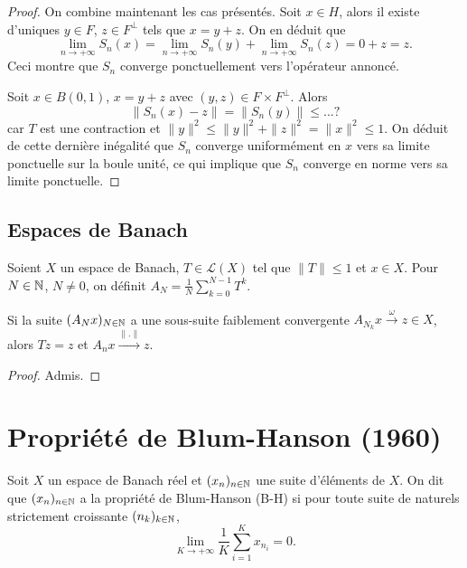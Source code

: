 \begin{proof}
  On combine maintenant les cas présentés. Soit $x\in H$, alors il existe
  d'uniques $y\in F$, $z\in F^{\perp}$ tels que $x = y + z$. On en déduit que
  $$\lim_{n\to+\infty}S_n(x) =
  \lim_{n\to+\infty}S_n(y) + \lim_{n\to+\infty}S_n(z)=
  0 + z = z.$$
  Ceci montre que $S_n$ converge ponctuellement vers l'opérateur annoncé.


  Soit $x\in B(0, 1)$, $x = y + z$ avec $(y, z)\in F\times F^\perp$.
  Alors $$\|S_n(x) - z \| = \|S_n(y)\| \leq ...?$$ %
  car $T$ est une contraction et
  $\|y\|^2\leq \|y\|^2 + \|z\|^2 = \|x\|^2 \leq 1$. On déduit de cette
  dernière inégalité que $S_n$ converge uniformément en $x$ vers sa limite
  ponctuelle sur la boule
  unité, ce qui implique que $S_n$ converge en norme vers sa limite ponctuelle.
\end{proof}

\subsection{Espaces de Banach}
\begin{thm}
  Soient $X$ un espace de Banach, $T\in\mathcal L(X)$ tel que $\|T\|\leq 1$
  et $x\in X$. Pour $N\in\mathbb{N}$, $N\neq 0$, on définit
  $A_N = \frac{1}{N}\sum_{k=0}^{N-1}T^k$.

  Si la suite $(A_Nx)_{N\in\mathbb{N}}$ a une sous-suite faiblement convergente
  $A_{N_k}x\xrightarrow{\omega}z\in X$, alors $Tz = z$ et
  $A_nx \xrightarrow{\|.\|} z$.
\end{thm}
\begin{proof}
  Admis.
\end{proof}
\section{Propriété de Blum-Hanson (1960)}
\begin{df}
  Soit $X$ un espace de Banach réel et $(x_n)_{n\in\mathbb{N}}$ une suite d'éléments de
  $X$. On dit que $(x_n)_{n\in\mathbb{N}}$ a la propriété de Blum-Hanson (B-H) si
  pour toute suite de naturels strictement croissante $(n_k)_{k\in\mathbb{N}}$,
  $$\lim_{K\to+\infty}\frac{1}{K}\sum_{i=1}^Kx_{n_i} = 0.$$
\end{df}

